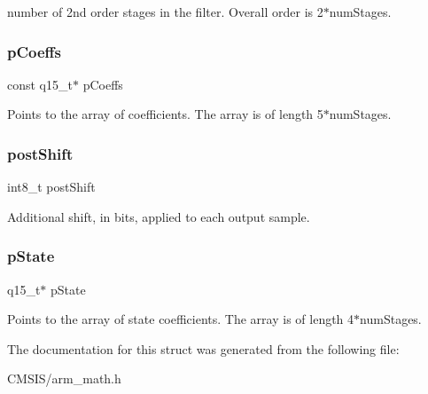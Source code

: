 number of 2nd order stages in the filter. Overall order is 2$\ast$num\+Stages. \mbox{\label{structarm__biquad__casd__df1__inst__q15_ae85d417edcdce57e9a54f8c841580578}} 
\subsubsection{\texorpdfstring{pCoeffs}{pCoeffs}}
{\footnotesize\ttfamily const q15\+\_\+t$\ast$ p\+Coeffs}

Points to the array of coefficients. The array is of length 5$\ast$num\+Stages. \mbox{\label{structarm__biquad__casd__df1__inst__q15_a3603cbf084938b6931bcb05dfe487f09}} 
\subsubsection{\texorpdfstring{postShift}{postShift}}
{\footnotesize\ttfamily int8\+\_\+t post\+Shift}

Additional shift, in bits, applied to each output sample. \mbox{\label{structarm__biquad__casd__df1__inst__q15_ae29dfdb736374fcddaeaec4b7770170c}} 
\subsubsection{\texorpdfstring{pState}{pState}}
{\footnotesize\ttfamily q15\+\_\+t$\ast$ p\+State}

Points to the array of state coefficients. The array is of length 4$\ast$num\+Stages. 

The documentation for this struct was generated from the following file\+:\begin{DoxyCompactItemize}
\item 
C\+M\+S\+I\+S/arm\+\_\+math.\+h\end{DoxyCompactItemize}
